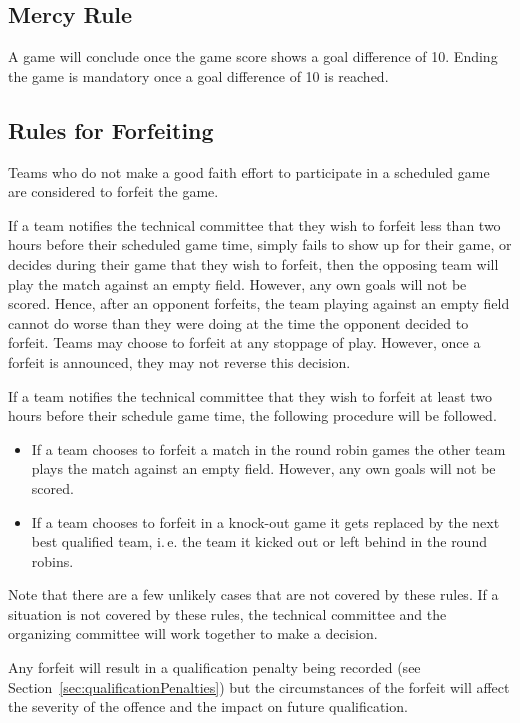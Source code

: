 \documentclass[12pt]{article}
\newcommand{\ie}{\mbox{i.\,e.}\xspace}
\newcommand{\cf}{see\xspace}
\begin{document}
\subsection{Mercy Rule}
\label{sec:mercy_rule}
A game will conclude once the game score shows a goal difference of 10.  Ending the game is mandatory once a goal difference of 10 is reached.

\subsection{Rules for Forfeiting}
\label{sec:forfeit}

Teams who do not make a good faith effort to participate in a scheduled game are considered to forfeit the game.

If a team notifies the technical committee that they wish to forfeit less than two hours before their scheduled game time, simply fails to show up for their game, or decides during their game that they wish to forfeit, then the opposing team will play the match against an empty field.  However, any own goals will not be scored.  Hence, after an opponent forfeits, the team playing against an empty field cannot do worse than they were doing at the time the opponent decided to forfeit.  Teams may choose to forfeit at any stoppage of play.  However, once a forfeit is announced, they may not reverse this decision.

If a team notifies the technical committee that they wish to forfeit at least two hours before their schedule game time, the following procedure will be followed.

\begin{itemize}
\item If a team chooses to forfeit a match in the round robin games the other team plays the match against an empty field.  However, any own goals will not be scored.
\item If a team chooses to forfeit in a knock-out game it gets replaced by the next best qualified team, \ie the team it kicked out or left behind in the round robins.
\end{itemize}

Note that there are a few unlikely cases that are not covered by these rules.  If a situation is not covered by these rules, the technical committee and the organizing committee will work together to make a decision.

Any forfeit will result in a qualification penalty being recorded (\cf Section~\ref{sec:qualificationPenalties}) but the circumstances of the forfeit will affect the severity of the offence and the impact on future qualification.
\end{document}
